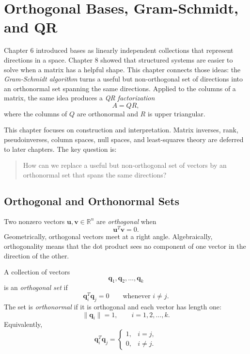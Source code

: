 
\chapter{Orthogonal Bases, Gram-Schmidt, and QR}
\label{mf:ch09-orthogonal-bases-gram-schmidt-qr}

Chapter 6 introduced bases as linearly independent collections that represent directions in a space. Chapter 8 showed that structured systems are easier to solve when a matrix has a helpful shape. This chapter connects those ideas: the \emph{Gram-Schmidt algorithm} turns a useful but non-orthogonal set of directions into an orthonormal set spanning the same directions. Applied to the columns of a matrix, the same idea produces a \emph{QR factorization}
\[
    A = QR,
\]
where the columns of \(Q\) are orthonormal and \(R\) is upper triangular.

This chapter focuses on construction and interpretation. Matrix inverses, rank, pseudoinverses, column spaces, null spaces, and least-squares theory are deferred to later chapters. The key question is:

\begin{quote}
How can we replace a useful but non-orthogonal set of vectors by an orthonormal set that spans the same directions?
\end{quote}

\section{Orthogonal and Orthonormal Sets}
\label{mf:orthogonal-bases}

Two nonzero vectors \(\mathbf{u},\mathbf{v}\in\mathbb{R}^n\) are \emph{orthogonal} when
\[
    \mathbf{u}^T\mathbf{v}=0.
\]
Geometrically, orthogonal vectors meet at a right angle. Algebraically, orthogonality means that the dot product sees no component of one vector in the direction of the other.

A collection of vectors
\[
    \mathbf{q}_1,\mathbf{q}_2,\ldots,\mathbf{q}_k
\]
is an \emph{orthogonal set} if
\[
    \mathbf{q}_i^T\mathbf{q}_j=0
    \qquad \text{whenever } i\neq j.
\]
The set is \emph{orthonormal} if it is orthogonal and each vector has length one:
\[
    \|\mathbf{q}_i\|=1,
    \qquad i=1,2,\ldots,k.
\]
Equivalently,
\[
    \mathbf{q}_i^T\mathbf{q}_j=\begin{cases}
        1, & i=j,\\
        0, & i\neq j.
    \end{cases}
\]

